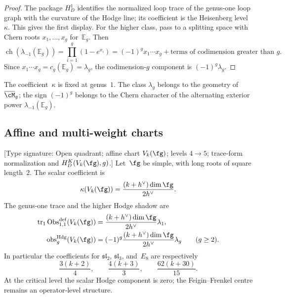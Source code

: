 \begin{proof}
The package $H_D^1$ identifies the normalized loop trace of the
genus-one loop graph with the curvature of the Hodge line; its
coefficient is the Heisenberg level~$\kappa$.  This gives the first
display.  For the higher class, pass to a splitting space with Chern
roots $x_1,\ldots,x_g$ for~$\mathbb E_g$.  Then
\[
 \operatorname{ch}\!\left(\lambda_{-1}(\mathbb E_g)\right)
 =\prod_{i=1}^g(1-e^{x_i})
 =(-1)^g x_1\cdots x_g+\text{terms of codimension greater than }g.
\]
Since $x_1\cdots x_g=c_g(\mathbb E_g)=\lambda_g$, the
codimension-$g$ component is $(-1)^g\lambda_g$.
\end{proof}

\begin{remark}
\label{rem:heisenberg-anomaly}
The coefficient~$\kappa$ is fixed at genus~$1$.  The class
$\lambda_g$ belongs to the geometry of~$\overline{\cM}_g$; the sign
$(-1)^g$ belongs to the Chern character of the alternating exterior
power $\lambda_{-1}(\mathbb E_g)$.
\end{remark}

\subsection{Affine and multi-weight charts}
\label{subsec:kac-moody-obstruction}

\begin{theorem}
\label{thm:kac-moody-obs}
\textup{[Type signature: Open quadrant; affine chart $V_k(\fg)$;
levels $4\to5$; trace-form normalization and $H_D^K(V_k(\fg),g)$.]}
Let~$\fg$ be simple, with long roots of square length~$2$.  The scalar
coefficient is
\[
 \kappa(V_k(\fg))
 =\frac{(k+h^\vee)\dim\fg}{2h^\vee}.
\]
The genus-one trace and the higher Hodge shadow are
\begin{align}
 \operatorname{tr}_1\operatorname{Obs}^{\mathrm{def}}_{1,1}(V_k(\fg))
 &=\frac{(k+h^\vee)\dim\fg}{2h^\vee}\lambda_1,\\
 \operatorname{obs}^{\mathrm{Hdg}}_g(V_k(\fg))
 &=(-1)^g\frac{(k+h^\vee)\dim\fg}{2h^\vee}\lambda_g
 \qquad(g\ge2).
\end{align}
In particular the coefficients for
$\mathfrak{sl}_2$, $\mathfrak{sl}_3$, and~$E_8$ are respectively
\[
 \frac{3(k+2)}4,\qquad
 \frac{4(k+3)}3,\qquad
 \frac{62(k+30)}{15}.
\]
At the critical level the scalar Hodge component is zero; the
Feigin--Frenkel centre remains an operator-level structure.
\end{theorem}

